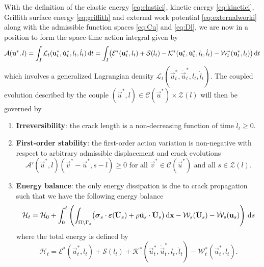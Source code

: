 With the definition of the elastic energy \eqref{eq:elastici}, kinetic energy \eqref{eq:kinetici}, Griffith surface energy \eqref{eq:griffith} and external work potential \eqref{eq:externalworki} along with the admissible function spaces \eqref{eq:Cu} and \eqref{eq:Dl}, we are now in a position to form the space-time action integral given by
\begin{equation} \label{eq:action}
\mathcal{A}(\vec{u}^*,l)=\int_I\mathcal{L}_t(\vec{u}^*_t,\dot{\vec{u}}^*_t,l_t,\dot{l}_t)\D{t}=\int_I\bigl(\mathcal{E}^*(\vec{u}_t^*,l_t)+\mathcal{S}(l_t)-\mathcal{K}^*(\vec{u}_t^*,\dot{\vec{u}}_t^*,l_t,\dot{l}_t)-\mathcal{W}_t^*(\vec{u}_t^*,l_t)\bigr)\D{t}
\end{equation}
which involves a generalized Lagrangian density $\mathcal{L}_t(\vec{u}^*_t,\dot{\vec{u}}^*_t,l_t,\dot{l}_t)$. The coupled evolution described by the couple $(\vec{u}^*,l)\in\mathcal{C}(\vec{u}^*)\times\mathcal{Z}(l)$ will then be governed by
\begin{definition} \label{def:griffith}
\begin{enumerate}
\item \textbf{Irreversibility}: the crack length is a non-decreasing function of time $\dot{l}_t\geq 0$.
\item \textbf{First-order stability}: the first-order action variation is non-negative with respect to arbitrary admissible displacement and crack evolutions
\begin{equation} \label{eq:stability}
\mathcal{A}'(\vec{u}^*,l)(\vec{v}^*-\vec{u}^*,s-l)\geq 0\text{ for all $\vec{v}^*\in\mathcal{C}(\vec{u}^*)$ and all $s\in\mathcal{Z}(l)$}.
\end{equation}
\item \textbf{Energy balance}: the only energy dissipation is due to crack propagation such that we have the following energy balance
\begin{equation} \label{eq:eb}
\mathcal{H}_t=\mathcal{H}_0+\int_0^t\left(\int_{\Omega\setminus\Gamma_s}\bigl(\sig_s\cdot\eps(\dot{\vec{U}}_s)+\rho\ddot{\vec{u}}_s\cdot\dot{\vec{U}}_s\bigr)\dx-\mathcal{W}_s(\dot{\vec{U}}_s)-\dot{\mathcal{W}}_s(\vec{u}_s)\right)\D{s}
\end{equation}
where the total energy is defined by
\begin{equation}
\mathcal{H}_t=\mathcal{E}^*(\vec{u}_t^*,l_t)+\mathcal{S}(l_t)+\mathcal{K}^*(\vec{u}_t^*,\dot{\vec{u}}_t^*,l_t,\dot{l}_t)-\mathcal{W}^*_t(\vec{u}_t^*,l_t).
\end{equation}
\end{enumerate}
\end{definition}

